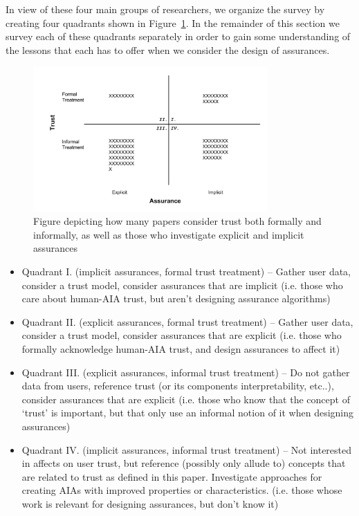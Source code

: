 In view of these four main groups of researchers, we organize the survey by creating four quadrants shown in Figure~\ref{fig:trust_assurance_intention}. In the remainder of this section we survey each of these quadrants separately in order to gain some understanding of the lessons that each has to offer when we consider the design of assurances.

\begin{figure}[htbp]
    \centering
    \includegraphics[width=0.8\textwidth]{Figures/Trust_vs_Assurance_Intention.pdf}
    \caption{Figure depicting how many papers consider trust both formally and informally, as well as those who investigate explicit and implicit assurances}
    \label{fig:trust_assurance_intention}
\end{figure}

\begin{itemize}
    \item Quadrant I. (implicit assurances, formal trust treatment) -- Gather user data, consider a trust model, consider assurances that are implicit (i.e. those who care about human-AIA trust, but aren't designing assurance algorithms)
    \item Quadrant II. (explicit assurances, formal trust treatment) -- Gather user data, consider a trust model, consider assurances that are explicit (i.e. those who formally acknowledge human-AIA trust, and design assurances to affect it)
    \item Quadrant III. (explicit assurances, informal trust treatment) -- Do not gather data from users, reference trust (or its components interpretability, etc..), consider assurances that are explicit (i.e. those who know that the concept of `trust' is important, but that only use an informal notion of it when designing assurances)
    \item Quadrant IV. (implicit assurances, informal trust treatment) -- Not interested in affects on user trust, but reference (possibly only allude to) concepts that are related to trust as defined in this paper. Investigate approaches for creating AIAs with improved properties or characteristics. (i.e. those whose work is relevant for designing assurances, but don't know it)
\end{itemize}





